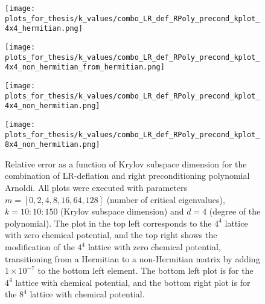 \begin{figure}[H]
    \centering
    \begin{minipage}{0.45\textwidth}
        \centering
        \texttt{[image: plots\_for\_thesis/k\_values/combo\_LR\_def\_RPoly\_precond\_kplot\_4x4\_hermitian.png]} %
    \end{minipage}%
    \hspace{0.02\textwidth} %
    \begin{minipage}{0.45\textwidth}
        \centering
        \texttt{[image: plots\_for\_thesis/k\_values/combo\_LR\_def\_RPoly\_precond\_kplot\_4x4\_non\_hermitian\_from\_hermitian.png]} %
    \end{minipage}
    
    \vspace{0.02\textwidth} %
    
    \begin{minipage}{0.45\textwidth}
        \centering
        \texttt{[image: plots\_for\_thesis/k\_values/combo\_LR\_def\_RPoly\_precond\_kplot\_4x4\_non\_hermitian.png]} %
    \end{minipage}%
    \hspace{0.02\textwidth} %
    \begin{minipage}{0.45\textwidth}
        \centering
        \texttt{[image: plots\_for\_thesis/k\_values/combo\_LR\_def\_RPoly\_precond\_kplot\_8x4\_non\_hermitian.png]} %
    \end{minipage}
    
    \caption{\small Relative error as a function of Krylov subspace dimension for the combination of LR-deflation and right preconditioning polynomial Arnoldi. All plots were executed with parameters $m = [0, 2, 4, 8, 16, 64, 128]$ (number of critical eigenvalues), $k = 10:10:150$ (Krylov subspace dimension) and $d = 4$ (degree of the polynomial). The plot in the top left corresponds to the $4^4$ lattice with zero chemical potential, and the top right shows the modification of the $4^4$ lattice with zero chemical potential, transitioning from a Hermitian to a non-Hermitian matrix by adding $1 \times 10^{-7}$ to the bottom left element. The bottom left plot is for the $4^4$ lattice with chemical potential, and the bottom right plot is for the $8^4$ lattice with chemical potential.}
    \label{fig:combo_LR+right_pre_cond_k_plot}
\end{figure}

